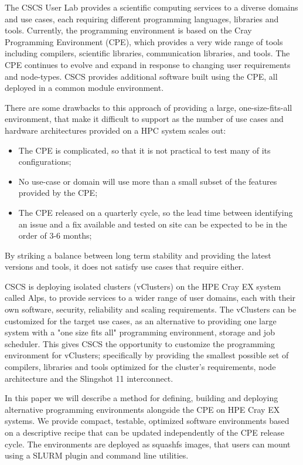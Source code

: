 The CSCS User Lab provides a scientific computing services to a diverse domains and use cases, each requiring different programming languages, libraries and tools.
Currently, the programming environment is based on the Cray Programming Environment (CPE), which provides a very wide range of tools including compilers, scientific libraries, communication libraries, and tools.
The CPE continues to evolve and expand in response to changing user requirements and node-types.
CSCS provides additional software built using the CPE, all deployed in a common module environment.

There are some drawbacks to this approach of providing a large, one-size-fits-all environment, that make it difficult to support as the number of use cases and hardware architectures provided on a HPC system scales out:
\begin{itemize}
    \item The CPE is complicated, so that it is not practical to test many of its configurations;
    \item No use-case or domain will use more than a small subset of the features provided by the CPE;
    \item The CPE released on a quarterly cycle, so the lead time between identifying an issue and a fix available and tested on site can be expected to be in the order of 3-6 months;
\end{itemize}
By striking a balance between long term stability and providing the latest versions and tools, it does not satisfy use cases that require either.

CSCS is deploying isolated clusters (vClusters) on the HPE Cray EX system called Alps, to provide services to a wider range of user domains, each with their own software, security, reliability and scaling requirements.
The vClusters can be customized for the target use cases, as an alternative to providing one large system with a "one size fits all" programming environment, storage and job scheduler.
This gives CSCS the opportunity to customize the programming environment for vClusters; specifically by providing the smallest possible set of compilers, libraries and tools optimized for the cluster's requirements, node architecture and the Slingshot 11 interconnect.

In this paper we will describe a method for defining, building and deploying alternative programming environments alongside the CPE on HPE Cray EX systems.
We provide compact, testable, optimized software environments based on a descriptive recipe that can be updated independently of the CPE release cycle.
The environments are deployed as squashfs images, that users can mount using a SLURM plugin and command line utilities.
